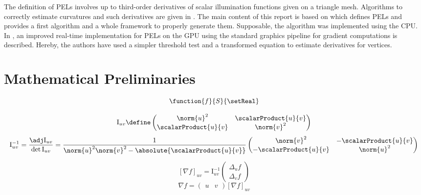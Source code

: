\documentclass[9pt,fleqn,twoside,twocolumn]{stdglobal}
\begin{document}
  The definition of PELs involves up to third-order derivatives of scalar illumination functions given on a triangle mesh.
  Algorithms to correctly estimate curvatures and such derivatives are given in \textcite{rusinkiewicz2004}.
  The main content of this report is based on \textcite{xie2007} which defines PELs and provides a first algorithm and a whole framework to properly generate them.
  Supposable, the algorithm was implemented using the CPU.
  In \textcite{zhang2010}, an improved real-time implementation for PELs on the GPU using the standard graphics pipeline for gradient computations is described.
  Hereby, the authors have used a simpler threshold test and a transformed equation to estimate derivatives for vertices.


\section{Mathematical Preliminaries}
  \begin{definition}
    \[
      \function{f}{S}{\setReal}
    \]
  \end{definition}

  \begin{definition}
    \[
      \mathrm{I}_{uv} \define
      \begin{pmatrix}
        \norm{u}^2 & \scalarProduct{u}{v} \\
        \scalarProduct{u}{v} & \norm{v}^2
      \end{pmatrix}
    \]
    \[
      \mathrm{I}^{-1}_{uv} = \frac{\adj \mathrm{I}_{uv}}{\det \mathrm{I}_{uv}} =
      \frac{1}{\norm{u}^2\norm{v}^2 - \absolute{\scalarProduct{u}{v}}}
      \begin{pmatrix}
        \norm{v}^2 & -\scalarProduct{u}{v} \\
        -\scalarProduct{u}{v} & \norm{u}^2
      \end{pmatrix}
    \]
  \end{definition}

  \begin{definition}
    \[
      [\nabla f]_{uv} = \mathrm{I}^{-1}_{uv}
      \begin{pmatrix}
        \Delta_u f \\
        \Delta_v f
      \end{pmatrix}
    \]
    \[
      \nabla f =
      \begin{pmatrix}
        u & v
      \end{pmatrix}
      [\nabla f]_{uv}
    \]
  \end{definition}
\end{document}
